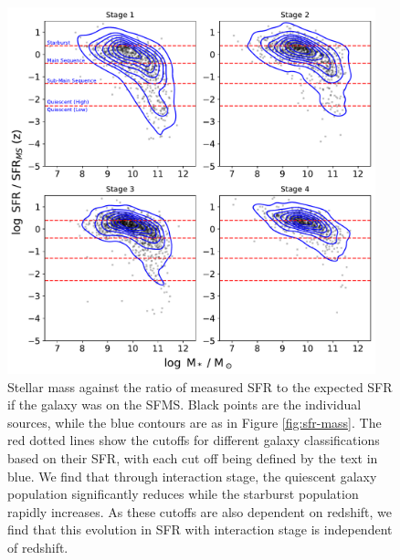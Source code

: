 \begin{figure}
    \centering
    \includegraphics[width=0.95\textwidth]{Chapter3/figures/sfr-clsf-dist.pdf}
    \caption{Stellar mass against the ratio of measured SFR to the expected SFR if the galaxy was on the SFMS. Black points are the individual sources, while the blue contours are as in Figure \ref{fig:sfr-mass}. The red dotted lines show the cutoffs for different galaxy classifications based on their SFR, with each cut off being defined by the text in blue. We find that through interaction stage, the quiescent galaxy population significantly reduces while the starburst population rapidly increases. As these cutoffs are also dependent on redshift, we find that this evolution in SFR with interaction stage is independent of redshift.}
    \label{fig:sfr-clsf}
\end{figure}

